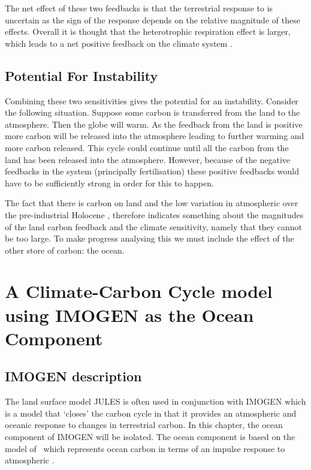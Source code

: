 The net effect of these two feedbacks is that the terrestrial response to  is uncertain as the sign of the response depends on the relative magnitude of these effects. Overall it
is thought that the heterotrophic respiration effect is larger, which leads to a net positive feedback on the climate system \parencite{Cox2000,Friedlingstein2006,Arora2020}.

\subsection{Potential For Instability}
Combining these two sensitivities gives the potential for an instability. Consider the following situation. Suppose some carbon is transferred from the land to the atmosphere. Then the globe
will warm. As the feedback from the land is positive more carbon will be released into the atmosphere leading to further warming and more carbon released. This cycle could continue until all the
carbon from the land has been released into the atmosphere. However, because of the negative feedbacks in the system (principally  fertilisation) these positive feedbacks would have to be
sufficiently strong in order for this to happen.

The fact that there is carbon on land and the low variation in atmospheric  over the pre-industrial Holocene \parencite{Marcott2014,Bauska2015}, therefore indicates something about
the magnitudes of the land carbon feedback and the climate sensitivity, namely that they cannot be too large.
To make progress analysing this we must include the effect of the other store of carbon: the ocean.

\section{A Climate-Carbon Cycle model using IMOGEN as the Ocean Component}
\subsection{IMOGEN description}
The land surface model JULES is often used in conjunction with IMOGEN \parencite{Huntingford2004,Huntingford2010} which is a model that `closes' the carbon cycle in that it provides
an atmospheric and oceanic response to changes in terrestrial carbon. In this chapter, the ocean component of IMOGEN will be isolated. The ocean component is based on the
model of~\cite{Joos1996} which represents ocean carbon in terms of an impulse response to atmospheric .

